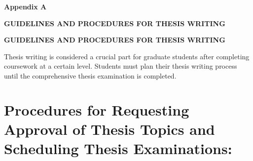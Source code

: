 \cleardoublepage
    \thispagestyle{empty}
\vspace*{\fill}
\begin{center}
    {\fontsize{18pt}{18pt} \bfseries Appendix A\par}
    {\fontsize{18pt}{18pt} \bfseries GUIDELINES AND PROCEDURES FOR THESIS WRITING\par}
\end{center}
\vspace*{\fill}
\clearpage

\begin{center}
    {\fontsize{18pt}{18pt} \bfseries GUIDELINES AND PROCEDURES FOR THESIS WRITING\par}
\end{center}
\vspace{1em}

Thesis writing is considered a crucial part for graduate students after completing coursework at a certain level. Students must plan their thesis writing process until the comprehensive thesis examination is completed.

\section*{Procedures for Requesting Approval of Thesis Topics and Scheduling Thesis Examinations:}

